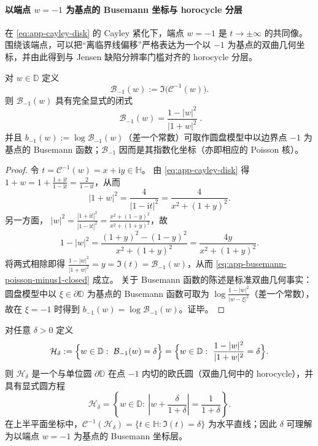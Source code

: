 \paragraph{以端点 \texorpdfstring{$w=-1$}{w=-1} 为基点的 Busemann 坐标与 horocycle 分层}\label{par:app-horocycle-busemann}
在 \eqref{eq:app-cayley-disk} 的 Cayley 紧化下，端点 \(w=-1\) 是 \(t\to\pm\infty\) 的共同像。
围绕该端点，可以把“离临界线偏移”严格表达为一个以 \(-1\) 为基点的双曲几何坐标，并由此得到与 Jensen 缺陷分辨率门槛对齐的 horocycle 分层。

\begin{proposition}\label{prop:app-busemann-poisson-minus1}
对 \(w\in\mathbb{D}\) 定义
\[
\mathcal{B}_{-1}(w):=\Im\bigl(\mathcal{C}^{-1}(w)\bigr).
\]
则 \(\mathcal{B}_{-1}(w)\) 具有完全显式的闭式
\begin{equation}\label{eq:app-busemann-poisson-minus1-closed}
\boxed{\;
\mathcal{B}_{-1}(w)
=\frac{1-|w|^{2}}{|1+w|^{2}}
\; }.
\end{equation}
并且 \(b_{-1}(w):=\log\mathcal{B}_{-1}(w)\)（差一个常数）可取作圆盘模型中以边界点 \(-1\) 为基点的 Busemann 函数；\(\mathcal{B}_{-1}\) 因而是其指数化坐标（亦即相应的 Poisson 核）。
\end{proposition}

\begin{proof}
令 \(t=\mathcal{C}^{-1}(w)=x+\mathrm{i}y\in\mathbb{H}\)。
由 \eqref{eq:app-cayley-disk} 得
\(
1+w=1+\frac{1+\mathrm{i}t}{1-\mathrm{i}t}=\frac{2}{1-\mathrm{i}t}
\)，从而
\[
|1+w|^{2}=\frac{4}{|1-\mathrm{i}t|^{2}}
=\frac{4}{x^{2}+(1+y)^{2}}.
\]
另一方面，
\(
|w|^{2}=\frac{|1+\mathrm{i}t|^{2}}{|1-\mathrm{i}t|^{2}}
=\frac{x^{2}+(1-y)^{2}}{x^{2}+(1+y)^{2}}
\)，故
\[
1-|w|^{2}
=\frac{(1+y)^{2}-(1-y)^{2}}{x^{2}+(1+y)^{2}}
=\frac{4y}{x^{2}+(1+y)^{2}}.
\]
将两式相除即得
\(
\frac{1-|w|^{2}}{|1+w|^{2}}=y=\Im(t)=\mathcal{B}_{-1}(w)
\)，从而 \eqref{eq:app-busemann-poisson-minus1-closed} 成立。
关于 Busemann 函数的陈述是标准双曲几何事实：圆盘模型中以 \(\xi\in\partial\mathbb{D}\) 为基点的 Busemann 函数可取为 \(\log\frac{1-|w|^{2}}{|w-\xi|^{2}}\)（差一个常数），故在 \(\xi=-1\) 时得到 \(b_{-1}(w)=\log\mathcal{B}_{-1}(w)\)。证毕。
\end{proof}

\begin{theorem}[horocycle 分层：\texorpdfstring{$\mathcal{B}_{-1}(w)=\delta$}{Bminus1=delta} 的水平集是内切圆]\label{thm:app-horocycle-foliation-minus1}
对任意 \(\delta>0\) 定义
\[
\mathcal{H}_{\delta}:=\Bigl\{w\in\mathbb{D}:\ \mathcal{B}_{-1}(w)=\delta\Bigr\}
=\Bigl\{w\in\mathbb{D}:\ \frac{1-|w|^{2}}{|1+w|^{2}}=\delta\Bigr\}.
\]
则 \(\mathcal{H}_{\delta}\) 是一个与单位圆 \(\partial\mathbb{D}\) 在点 \(-1\) 内切的欧氏圆（双曲几何中的 horocycle），并具有显式圆方程
\begin{equation}\label{eq:app-horocycle-circle-euclid}
\boxed{\;
\mathcal{H}_{\delta}
=\left\{w\in\mathbb{D}:\ \left|w+\frac{\delta}{1+\delta}\right|=\frac{1}{1+\delta}\right\}.
\;}
\end{equation}
在上半平面坐标中，\(\mathcal{C}^{-1}(\mathcal{H}_{\delta})=\{t\in\mathbb{H}:\Im(t)=\delta\}\) 为水平直线；因此 \(\delta\) 可理解为以端点 \(w=-1\) 为基点的 Busemann 坐标层。
\end{theorem}

